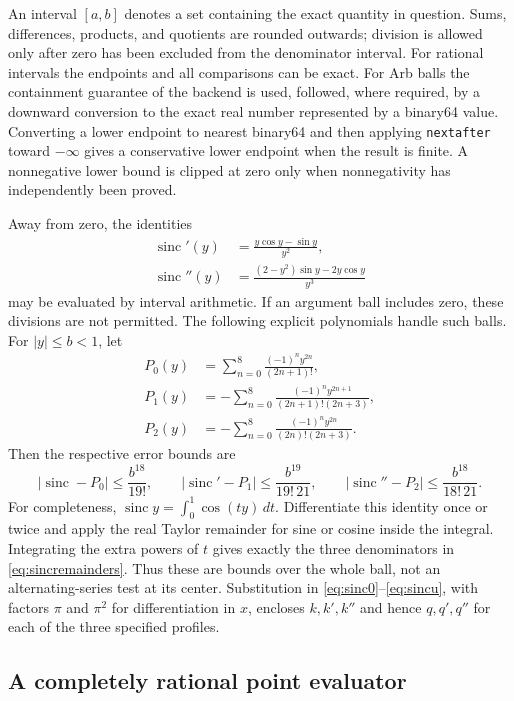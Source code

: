 \documentclass[11pt]{amsart}
\numberwithin{equation}{section}
\newcommand{\sinc}{\operatorname{sinc}}
\begin{document}
An interval $[a,b]$ denotes a set containing the exact quantity in
question. Sums, differences, products, and quotients are rounded
outwards; division is allowed only after zero has been excluded from
the denominator interval. For rational intervals the endpoints and all
comparisons can be exact. For Arb balls the containment guarantee of the
backend is used, followed, where required, by a downward conversion to
the exact real number represented by a binary64 value. Converting a
lower endpoint to nearest binary64 and then applying
\texttt{nextafter} toward $-\infty$ gives a conservative lower endpoint
when the result is finite. A nonnegative lower bound is clipped at zero
only when nonnegativity has independently been proved.

Away from zero, the identities
\begin{align*}
 \sinc'(y)&=\frac{y\cos y-\sin y}{y^2},\\
 \sinc''(y)&=\frac{(2-y^2)\sin y-2y\cos y}{y^3}
\end{align*}
may be evaluated by interval arithmetic. If an argument ball includes
zero, these divisions are not permitted. The following explicit
polynomials handle such balls. For $|y|\leq b<1$, let
\begin{align*}
 P_0(y)&=\sum_{n=0}^{8}\frac{(-1)^ny^{2n}}{(2n+1)!},\\
 P_1(y)&=-\sum_{n=0}^{8}\frac{(-1)^ny^{2n+1}}{(2n+1)!(2n+3)},\\
 P_2(y)&=-\sum_{n=0}^{8}\frac{(-1)^ny^{2n}}{(2n)!(2n+3)}.
\end{align*}
Then the respective error bounds are
\begin{equation}\label{eq:sincremainders}
 |\sinc-P_0|\leq\frac{b^{18}}{19!},\qquad
 |\sinc'-P_1|\leq\frac{b^{19}}{19!\,21},\qquad
 |\sinc''-P_2|\leq\frac{b^{18}}{18!\,21}.
\end{equation}
For completeness, $\sinc y=\int_0^1\cos(ty)\,dt$.
Differentiate this identity once or twice and apply the real Taylor
remainder for sine or cosine inside the integral. Integrating the
extra powers of $t$ gives exactly the three denominators in
\eqref{eq:sincremainders}. Thus these are bounds over the whole ball,
not an alternating-series test at its center. Substitution in
\eqref{eq:sinc0}--\eqref{eq:sincu}, with factors $\pi$ and $\pi^2$
for differentiation in $x$, encloses $k,k',k''$ and hence $q,q',q''$
for each of the three specified profiles.

\subsection{A completely rational point evaluator}
\end{document}
